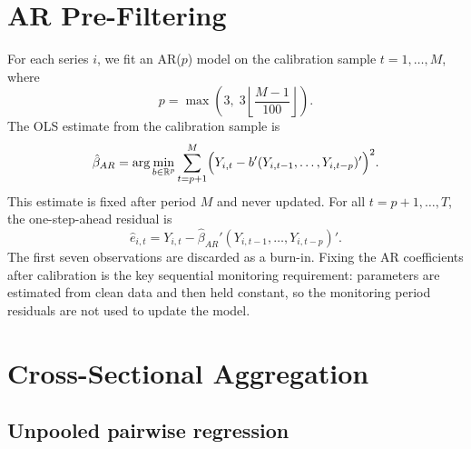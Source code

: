 \documentclass[12pt]{article}
\begin{document}
\section{AR Pre-Filtering}
\label{sec:arfilter}

For each series $i$, we fit an AR($p$) model on the calibration sample
$t=1,\dots,M$, where
\begin{equation}
p = \max\!\left(3,\; 3\left\lfloor\frac{M-1}{100}\right\rfloor\right).
\label{eq:p}
\end{equation}
The OLS estimate from the calibration sample is
\begin{equation}
\hat\beta_{AR} = \arg\min_{b\in\mathbb{R}^p}
\sum_{t=p+1}^{M}
\Bigl(Y_{i,t} - b'(Y_{i,t-1},\dots,Y_{i,t-p})'\Bigr)^2.
\label{eq:arcal}
\end{equation}
This estimate is fixed after period $M$ and never updated. For all
$t = p+1,\dots,T$, the one-step-ahead residual is
\begin{equation}
\hat e_{i,t} = Y_{i,t} - \hat\beta_{AR}'(Y_{i,t-1},\dots,Y_{i,t-p})'.
\label{eq:residual}
\end{equation}
The first seven observations are discarded as a burn-in. Fixing the AR
coefficients after calibration is the key sequential monitoring requirement:
parameters are estimated from clean data and then held constant, so the
monitoring period residuals are not used to update the model.

\section{Cross-Sectional Aggregation}
\label{sec:pool}

\subsection{Unpooled pairwise regression}
\end{document}
